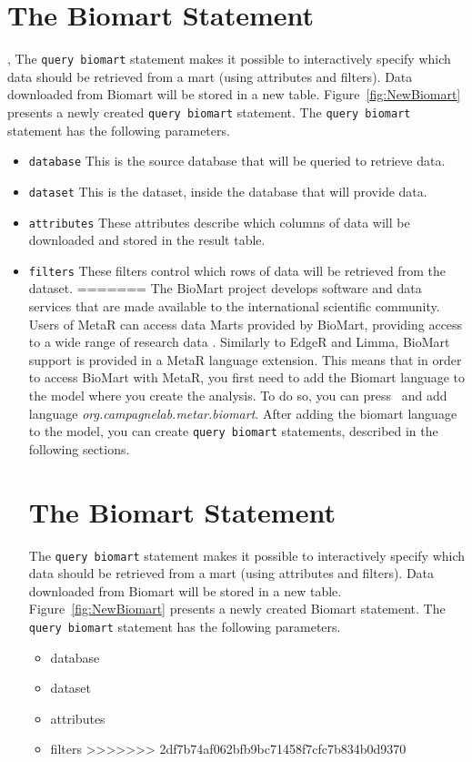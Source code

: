 \section{The Biomart Statement},
The \texttt{query biomart} statement makes it possible to interactively specify which data should be retrieved from a mart (using attributes and filters). Data downloaded from Biomart will be stored in a new table. Figure~\ref{fig:NewBiomart} presents a newly created \texttt{query biomart} statement.
The \texttt{query biomart} statement has the following parameters.
\begin{itemize}
\item \texttt{database} This is the source database that will be queried to retrieve data.
\item \texttt{dataset} This is the dataset, inside the database that will provide data.
\item \texttt{attributes} These attributes describe which columns of data will be downloaded and stored in the result table.
\item \texttt{filters} These filters control which rows of data will be retrieved from the dataset.
=======
The BioMart project develops software and data services that are made available to the international scientific community. Users of MetaR can access data Marts provided by BioMart, providing access to a wide range of research data . Similarly to EdgeR and Limma, BioMart support is provided in a MetaR language extension. This means that in order to access BioMart with MetaR, you first need to add the Biomart language to the model where you create the analysis. To do so, you can press~ and add language \textit{org\allowbreak.campagnelab\allowbreak.metar\allowbreak.biomart}. After adding the biomart language to the model, you can create \texttt{query biomart} statements, described in the following sections. 

\section{The Biomart Statement}
The \texttt{query biomart} statement makes it possible to interactively specify which data should be retrieved from a mart (using attributes and filters). Data downloaded from Biomart will be stored in a new table. Figure~\ref{fig:NewBiomart} presents a newly created Biomart statement.
The \texttt{query biomart} statement has the following parameters.
\begin{itemize}
\item database
\item dataset
\item attributes
\item filters
>>>>>>> 2df7b74af062bfb9bc71458f7cfc7b834b0d9370
\end{itemize} 


\end{itemize}
